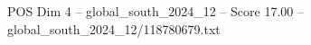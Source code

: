 \begin{textsample}{POS Dim 4 – global\_south\_2024\_12 – Score 17.00 – global\_south\_2024\_12/118780679.txt}
\end{textsample}
